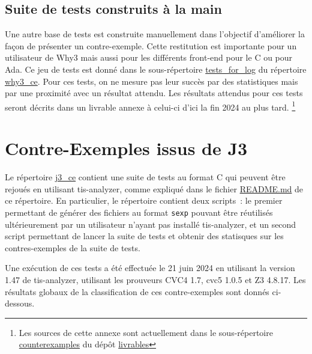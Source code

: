 \documentclass[a4paper,11pt]{article}
\begin{document}
\subsection{Suite de tests construits à la main}

Une autre base de tests est construite manuellement dans l'objectif d'améliorer
la façon de présenter un contre-exemple. Cette restitution est importante pour
un utilisateur de Why3 mais aussi pour les différents front-end pour le C ou
pour Ada. Ce jeu de tests est donné dans le sous-répertoire \url{tests_for_log}
du répertoire \url{why3_ce}. Pour ces tests, on ne mesure pas leur succès par des
statistiques mais par une proximité avec un résultat attendu. Les résultats
attendus pour ces tests seront décrits dans un livrable annexe à celui-ci d'ici
la fin 2024 au plus tard.  \footnote{Les sources de cette annexe sont
  actuellement dans le sous-répertoire \url{counterexamples} du dépôt
  \url{livrables}}

\section{Contre-Exemples issus de J3}

Le répertoire \url{j3_ce} contient une suite de tests au format C qui peuvent
être rejoués en utilisant tis-analyzer, comme expliqué dans le fichier
\url{README.md} de ce répertoire. En particulier, le répertoire contient
deux scripts~: le premier permettant de générer des fichiers au format
\texttt{sexp} pouvant être réutilisés ultérieurement par un utilisateur n'ayant
pas installé tis-analyzer, et un second script permettant de lancer la suite
de tests et obtenir des statisques sur les contres-exemples de la suite de tests.

Une exécution de ces tests a été effectuée le 21 juin 2024 en utilisant la
version 1.47 de tis-analyzer, utilisant les prouveurs CVC4 1.7, cvc5 1.0.5 et
Z3 4.8.17. Les résultats globaux de la classification de ces contre-exemples
sont donnés ci-dessous.
\end{document}
